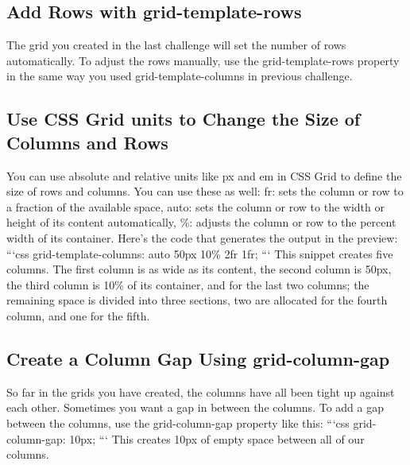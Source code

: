 \documentclass{article}%
\begin{document}
%
\subsection{Add Rows with grid{-}template{-}rows}%
\label{subsec:AddRowswithgrid{-}template{-}rows}%
The grid you created in the last challenge will set the number of rows automatically. To adjust the rows manually, use the grid{-}template{-}rows property in the same way you used grid{-}template{-}columns in previous challenge.\newline%

%
\subsection{Use CSS Grid units to Change the Size of Columns and Rows}%
\label{subsec:UseCSSGridunitstoChangetheSizeofColumnsandRows}%
You can use absolute and relative units like px and em in CSS Grid to define the size of rows and columns. You can use these as well:\newline%
fr: sets the column or row to a fraction of the available space,\newline%
auto: sets the column or row to the width or height of its content automatically,\newline%
\%: adjusts the column or row to the percent width of its container.\newline%
Here's the code that generates the output in the preview:\newline%
```css\newline%
grid{-}template{-}columns: auto 50px 10\% 2fr 1fr;\newline%
```\newline%
This snippet creates five columns. The first column is as wide as its content, the second column is 50px, the third column is 10\% of its container, and for the last two columns; the remaining space is divided into three sections, two are allocated for the fourth column, and one for the fifth.\newline%

%
\subsection{Create a Column Gap Using grid{-}column{-}gap}%
\label{subsec:CreateaColumnGapUsinggrid{-}column{-}gap}%
So far in the grids you have created, the columns have all been tight up against each other. Sometimes you want a gap in between the columns. To add a gap between the columns, use the grid{-}column{-}gap property like this:\newline%
```css\newline%
grid{-}column{-}gap: 10px;\newline%
```\newline%
This creates 10px of empty space between all of our columns.\newline%
\end{document}
